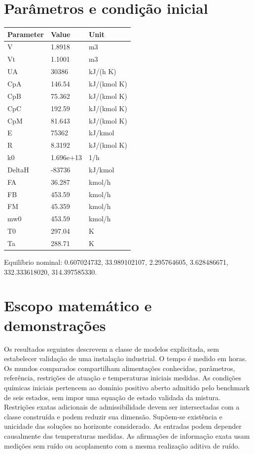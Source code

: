 \documentclass[
  11pt,
]{article}
\begin{document}
\hypertarget{paruxe2metros-e-condiuxe7uxe3o-inicial}{%
\section{Parâmetros e condição
inicial}\label{paruxe2metros-e-condiuxe7uxe3o-inicial}}

\begingroup\footnotesize

\begin{longtable}[]{@{}lll@{}}
\toprule\noalign{}
Parameter & Value & Unit \\
\midrule\noalign{}
\endhead
\bottomrule\noalign{}
\endlastfoot
V & 1.8918 & m3 \\
Vt & 1.1001 & m3 \\
UA & 30386 & kJ/(h K) \\
CpA & 146.54 & kJ/(kmol K) \\
CpB & 75.362 & kJ/(kmol K) \\
CpC & 192.59 & kJ/(kmol K) \\
CpM & 81.643 & kJ/(kmol K) \\
E & 75362 & kJ/kmol \\
R & 8.3192 & kJ/(kmol K) \\
k0 & 1.696e+13 & 1/h \\
DeltaH & -83736 & kJ/kmol \\
FA & 36.287 & kmol/h \\
FB & 453.59 & kmol/h \\
FM & 45.359 & kmol/h \\
mw0 & 453.59 & kmol/h \\
T0 & 297.04 & K \\
Ta & 288.71 & K \\
\end{longtable}

\endgroup

Equilíbrio nominal: 0.607024732, 33.989102107, 2.295764605, 3.628486671,
332.333618020, 314.397585330.

\hypertarget{escopo-matemuxe1tico-e-demonstrauxe7uxf5es}{%
\section{Escopo matemático e
demonstrações}\label{escopo-matemuxe1tico-e-demonstrauxe7uxf5es}}

Os resultados seguintes descrevem a classe de modelos explicitada, sem
estabelecer validação de uma instalação industrial. O tempo é medido em
horas. Os mundos comparados compartilham alimentações conhecidas,
parâmetros, referência, restrições de atuação e temperaturas iniciais
medidas. As condições químicas iniciais pertencem ao domínio positivo
aberto admitido pelo benchmark de seis estados, sem impor uma equação de
estado validada da mistura. Restrições exatas adicionais de
admissibilidade devem ser intersectadas com a classe construída e podem
reduzir sua dimensão. Supõem-se existência e unicidade das soluções no
horizonte considerado. As entradas podem depender causalmente das
temperaturas medidas. As afirmações de informação exata usam medições
sem ruído ou acoplamento com a mesma realização aditiva de ruído.
\end{document}
